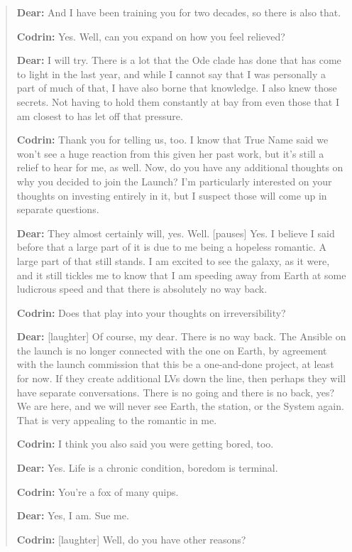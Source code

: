 \begin{quote}
\textbf{Dear:} And I have been training you for two decades, so there is also that.

\textbf{Codrin:} Yes. Well, can you expand on how you feel relieved?

\textbf{Dear:} I will try. There is a lot that the Ode clade has done that has come to light in the last year, and while I cannot say that I was personally a part of much of that, I have also borne that knowledge. I also knew those secrets. Not having to hold them constantly at bay from even those that I am closest to has let off that pressure.

\textbf{Codrin:} Thank you for telling us, too. I know that True Name said we won't see a huge reaction from this given her past work, but it's still a relief to hear for me, as well. Now, do you have any additional thoughts on why you decided to join the Launch? I'm particularly interested on your thoughts on investing entirely in it, but I suspect those will come up in separate questions.

\textbf{Dear:} They almost certainly will, yes. Well. {[}pauses{]} Yes. I believe I said before that a large part of it is due to me being a hopeless romantic. A large part of that still stands. I am excited to see the galaxy, as it were, and it still tickles me to know that I am speeding away from Earth at some ludicrous speed and that there is absolutely no way back.

\textbf{Codrin:} Does that play into your thoughts on irreversibility?

\textbf{Dear:} {[}laughter{]} Of course, my dear. There is no way back. The Ansible on the launch is no longer connected with the one on Earth, by agreement with the launch commission that this be a one-and-done project, at least for now. If they create additional LVs down the line, then perhaps they will have separate conversations. There is no going and there is no back, yes? We are here, and we will never see Earth, the station, or the System again. That is very appealing to the romantic in me.

\textbf{Codrin:} I think you also said you were getting bored, too.

\textbf{Dear:} Yes. Life is a chronic condition, boredom is terminal.

\textbf{Codrin:} You're a fox of many quips.

\textbf{Dear:} Yes, I am. Sue me.

\textbf{Codrin:} {[}laughter{]} Well, do you have other reasons?


\end{quote}

